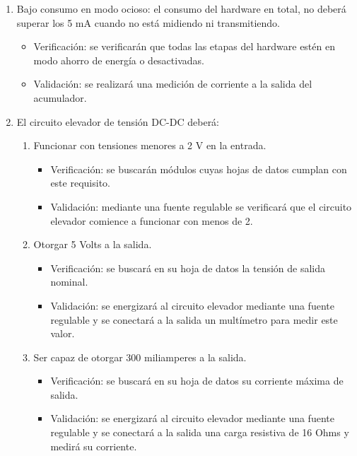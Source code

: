 \documentclass[11pt]{charter}
\begin{document}
\begin{enumerate}
\begin{enumerate}[label*=\arabic*.]
			\item Bajo consumo en modo ocioso: el consumo del hardware en total, no deberá superar los 5 mA cuando no está midiendo ni transmitiendo.
				\begin{itemize}
					\item Verificación: se verificarán que todas las etapas del hardware estén en modo ahorro de energía o desactivadas.\\
					\item Validación: se realizará una medición de corriente a la salida del acumulador.\\
				\end{itemize}
				
			\item El circuito elevador de tensión DC-DC deberá:
			\begin{enumerate}[label*=\arabic*.]
				\item Funcionar con tensiones menores a 2 V en la entrada.
					\begin{itemize}
						\item Verificación: se buscarán módulos cuyas hojas de datos cumplan con este requisito.\\
						\item Validación: mediante una fuente regulable se verificará que el circuito elevador comience a funcionar con menos de 2.\\
					\end{itemize}
					
				\item Otorgar 5 Volts a la salida.
					\begin{itemize}
						\item Verificación: se buscará en su hoja de datos la tensión de salida nominal.\\
						\item Validación: se energizará al circuito elevador mediante una fuente regulable y se conectará a la salida un multímetro para medir este valor.\\
					\end{itemize}
					
				\item Ser capaz de otorgar 300 miliamperes a la salida.
					\begin{itemize}
						\item Verificación: se buscará en su hoja de datos su corriente máxima de salida.\\
						\item Validación: se energizará al circuito elevador mediante una fuente regulable y se conectará a la salida una carga resistiva de 16 Ohms y medirá su corriente.\\
					\end{itemize}
			\end{enumerate}
			

\end{enumerate}
\end{enumerate}
\end{document}
